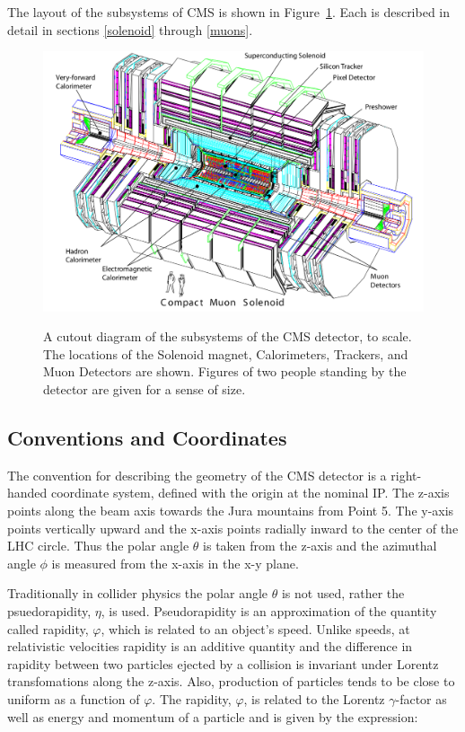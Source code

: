 The layout of the subsystems of CMS is shown in Figure~\ref{figapp:CMSlayout}.  Each is described in detail in sections \ref{solenoid} through \ref{muons}.



\begin{figure}[!Hh]
       \centering
       \includegraphics[scale=0.4]{Figures/CMSlayout.png} \\
       \caption[The basic layout of the CMS detector.]{A cutout diagram of the subsystems of the CMS detector, to scale.  The locations of the Solenoid magnet, Calorimeters, Trackers, and Muon Detectors are shown.  Figures of two people standing by the detector are given for a sense of size.}
\label{figapp:CMSlayout}
\end{figure}




\subsection{Conventions and Coordinates}

The convention for describing the geometry of the CMS detector is a right-handed coordinate system, defined with the origin at the nominal IP.  The z-axis points along the beam axis towards the Jura mountains from Point 5.  The y-axis points vertically upward and the x-axis points radially inward to the center of the LHC circle.  Thus the polar angle $\theta$ is taken from the z-axis and the azimuthal angle $\phi$ is measured from the x-axis in the x-y plane.  

Traditionally in collider physics the polar angle $\theta$ is not used, rather the psuedorapidity, $\eta$, is used.  Pseudorapidity is an approximation of the quantity called rapidity, $\varphi$, which is related to an object's speed.  Unlike speeds, at relativistic velocities rapidity is an additive quantity and the difference in rapidity between two particles ejected by a collision is invariant under Lorentz transfomations along the z-axis.  Also, production of particles tends to be close to uniform as a function of $\varphi$.  The rapidity, $\varphi$, is related to the Lorentz $\gamma$-factor as well as energy and momentum of a particle and is given by the expression:



